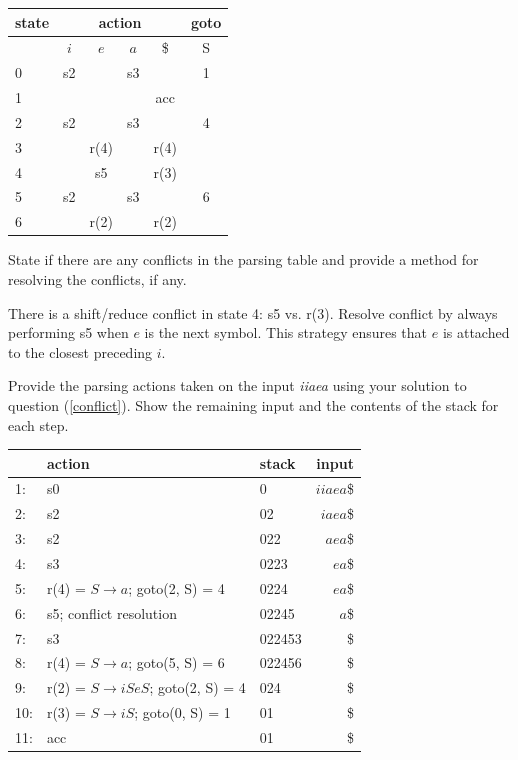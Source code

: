 \documentclass[12pt]{article}
\begin{document}
\begin{exe}
\begin{xlist}
{\begin{soln}
\begin{center}
\begin{tabular}{|l|cccc|c|}
\hline
state & \multicolumn{4}{c|}{action} & goto \\
\hline
& $i$ & $e$ & $a$ & \$ & S \\
\hline
0 & s2 & & s3 & & 1 \\
1 & & & & acc & \\
2 & s2 & & s3 & & 4 \\
3 & & r(4) & & r(4) & \\
4 & & s5 & & r(3) & \\
5 & s2 & & s3 & & 6 \\
6 & & r(2) & & r(2) & \\
\hline
\end{tabular}
\end{center}
\end{soln}
}

{\ex\label{conflict} State if there are any conflicts in the parsing table and provide a method for resolving the conflicts, if any. 

\begin{soln} 
There is a shift/reduce conflict in state 4: s5 vs. r(3). 
Resolve conflict by always performing s5 when $e$ is the next symbol. 
This strategy ensures that $e$ is attached to the closest preceding $i$.
\end{soln}
}

{\ex Provide the parsing actions taken on the input {\em iiaea} using your
solution to question (\ref{conflict}). 
Show the remaining input and the contents of the stack for each step. 

\begin{soln}
\begin{center}
\begin{tabular}{|lllr|}
\hline
& action & stack & input \\
\hline
1: & s0 & 0 & $iiaea$\$ \\
2: & s2 & 02 & $iaea$\$ \\
3: & s2 & 022 & $aea$\$ \\
4: & s3 & 0223 & $ea$\$ \\
5: & r(4) = $S \rightarrow a$; goto(2, S) = 4 & 0224 & $ea$\$ \\
6: & s5; conflict resolution & 02245 & $a$\$ \\
7: & s3 & 022453 & \$ \\
8: & r(4) = $S \rightarrow a$; goto(5, S) = 6 & 022456 & \$ \\
9: & r(2) = $S \rightarrow iSeS$; goto(2, S) = 4 & 024 & \$ \\
10: & r(3) = $S \rightarrow iS$; goto(0, S) = 1 & 01 & \$ \\
11: & acc & 01 & \$ \\
\hline
\end{tabular}
\end{center}
\end{soln}
}


\end{xlist}
\end{exe}
\end{document}

